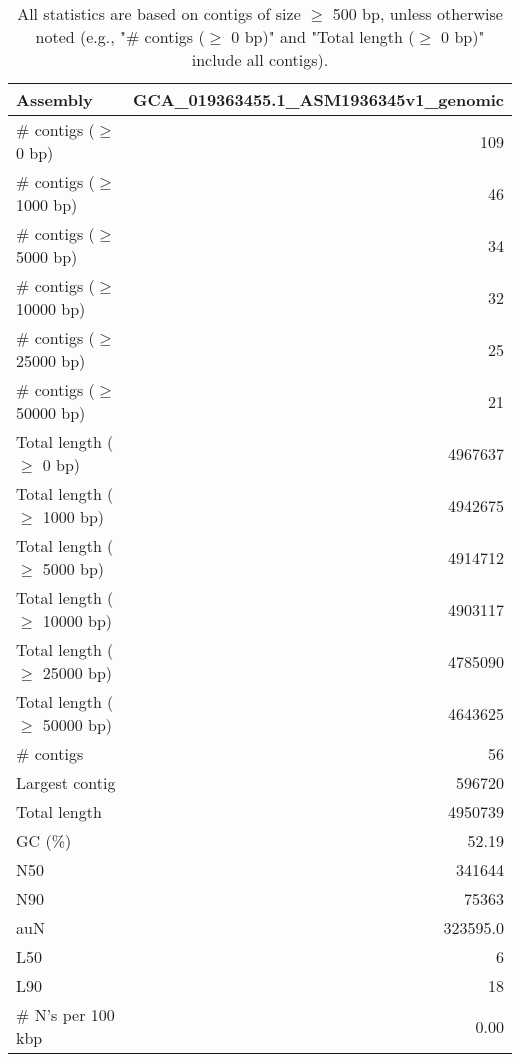 \documentclass[12pt,a4paper]{article}
\begin{document}
\begin{table}[ht]
\begin{center}
\caption{All statistics are based on contigs of size $\geq$ 500 bp, unless otherwise noted (e.g., "\# contigs ($\geq$ 0 bp)" and "Total length ($\geq$ 0 bp)" include all contigs).}
\begin{tabular}{|l*{1}{|r}|}
\hline
Assembly & GCA\_019363455.1\_ASM1936345v1\_genomic \\ \hline
\# contigs ($\geq$ 0 bp) & 109 \\ \hline
\# contigs ($\geq$ 1000 bp) & 46 \\ \hline
\# contigs ($\geq$ 5000 bp) & 34 \\ \hline
\# contigs ($\geq$ 10000 bp) & 32 \\ \hline
\# contigs ($\geq$ 25000 bp) & 25 \\ \hline
\# contigs ($\geq$ 50000 bp) & 21 \\ \hline
Total length ($\geq$ 0 bp) & 4967637 \\ \hline
Total length ($\geq$ 1000 bp) & 4942675 \\ \hline
Total length ($\geq$ 5000 bp) & 4914712 \\ \hline
Total length ($\geq$ 10000 bp) & 4903117 \\ \hline
Total length ($\geq$ 25000 bp) & 4785090 \\ \hline
Total length ($\geq$ 50000 bp) & 4643625 \\ \hline
\# contigs & 56 \\ \hline
Largest contig & 596720 \\ \hline
Total length & 4950739 \\ \hline
GC (\%) & 52.19 \\ \hline
N50 & 341644 \\ \hline
N90 & 75363 \\ \hline
auN & 323595.0 \\ \hline
L50 & 6 \\ \hline
L90 & 18 \\ \hline
\# N's per 100 kbp & 0.00 \\ \hline
\end{tabular}
\end{center}
\end{table}
\end{document}
